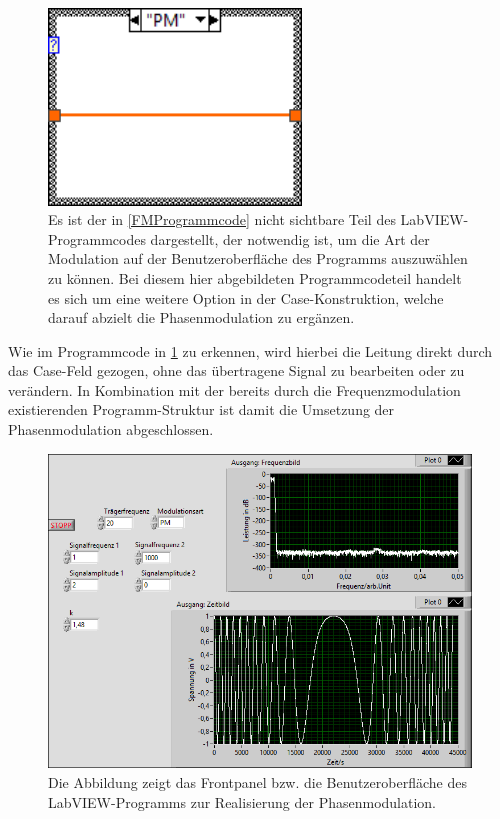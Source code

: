 \documentclass[
a4paper,
12pt,
pagesize,
ngerman
]{scrartcl}
\begin{document}
	\begin{figure}[H] %
		\centering
		\includegraphics[width=0.6\textwidth]{EIRE2018Dateien/Tag4/FMPM-Erzeugung/PM-FMPM-Erzeugungd1}
		\caption{Es ist der in \cref{FMProgrammcode} nicht sichtbare Teil des LabVIEW-Programmcodes dargestellt, der notwendig ist, um die Art der Modulation auf der Benutzeroberfläche des Programms auszuwählen zu können. Bei diesem hier abgebildeten Programmcodeteil handelt es sich um eine weitere Option in der Case-Konstruktion, welche darauf abzielt die Phasenmodulation zu ergänzen.}
		\label{PMProgrammcode}
	\end{figure}
	
	\noindent Wie im Programmcode in \cref{PMProgrammcode} zu erkennen, wird hierbei die Leitung direkt durch das Case-Feld gezogen, ohne das übertragene Signal zu bearbeiten oder zu verändern. 
	In Kombination mit der bereits durch die Frequenzmodulation existierenden Programm-Struktur ist damit die Umsetzung der Phasenmodulation abgeschlossen. 
	
	\begin{figure}[H]
		\centering
		\includegraphics[width=1.0\textwidth]{EIRE2018Dateien/Tag4/FMPM-Erzeugung/PM-FMPM-Erzeugungp}
		\caption{Die Abbildung zeigt das Frontpanel bzw. die Benutzeroberfläche des LabVIEW-Programms zur Realisierung der Phasenmodulation.}
		\label{PMAusgabe}
	\end{figure}
	
\end{document}
